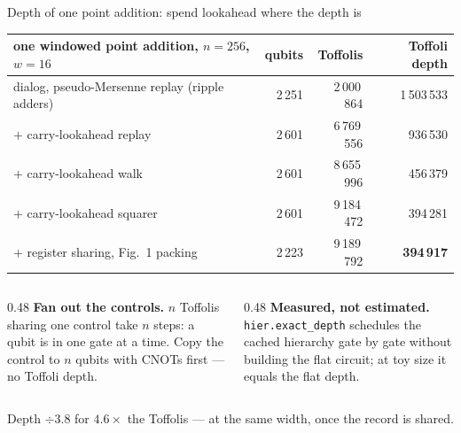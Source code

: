 \documentclass[aspectratio=169,11pt]{beamer}
\begin{document}
\begin{frame}{Depth of one point addition: spend lookahead where the depth is}
  \centering\footnotesize
  \renewcommand{\arraystretch}{1.12}
  \begin{tabular}{@{}lrrr@{}}
    \toprule
    one windowed point addition, $n=256$, $w=16$ & qubits & Toffolis & Toffoli depth \\
    \midrule
    dialog, pseudo-Mersenne replay (ripple adders) & 2\,251 & 2\,000\,864 & 1\,503\,533 \\
    \quad $+$ carry-lookahead replay & 2\,601 & 6\,769\,556 & 936\,530 \\
    \quad $+$ carry-lookahead walk & 2\,601 & 8\,655\,996 & 456\,379 \\
    \quad $+$ carry-lookahead squarer & 2\,601 & 9\,184\,472 & 394\,281 \\
    \quad $+$ register sharing, Fig.~1 packing & 2\,223 & 9\,189\,792 & \textbf{394\,917} \\
    \bottomrule
  \end{tabular}\par
  \vskip3mm
  \raggedright
  \begin{columns}[T]
    \begin{column}{0.48\textwidth}
      \small \textbf{Fan out the controls.} $n$ Toffolis sharing one control take $n$ steps: a qubit is in one gate at a time. Copy the control to $n$ qubits with CNOTs first --- no Toffoli depth.
    \end{column}
    \begin{column}{0.48\textwidth}
      \small \textbf{Measured, not estimated.} \texttt{hier.exact\_depth} schedules the cached hierarchy gate by gate without building the flat circuit; at toy size it equals the flat depth.
    \end{column}
  \end{columns}
  \begin{takeaway}Depth $\div3.8$ for $4.6\times$ the Toffolis --- at the same width, once the record is shared.\end{takeaway}
\end{frame}
\end{document}
